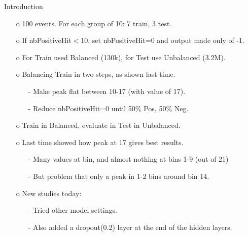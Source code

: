 \documentclass{beamer}
\begin{document}
\begin{frame}{Introduction}
\begin{enumerate}
\item[o] 100 events. For each group of 10: 7 train, 3 test.  
\item[o] If nbPositiveHit$<$10, set nbPositiveHit=0 and output made only of -1.
\item[o] For Train used Balanced (130k), for Test use Unbalanced (3.2M).
\item[o] Balancing Train in two steps, as shown last time.
\begin{enumerate}
\item[-] Make peak flat between 10-17 (with value of 17).
\item[-] Reduce nbPositiveHit=0 until 50\% Pos, 50\% Neg.
\end{enumerate}
\item[o] Train in Balanced, evaluate in Test in Unbalanced.
\item[o] Last time showed how peak at 17 gives best results.
 \begin{enumerate}
\item[-] Many values at bin, and almost nothing at bins 1-9 (out of 21)
\item[-] But problem that only a peak in 1-2 bins around bin 14.
\end{enumerate}
\item[o] New studies today:
 \begin{enumerate}
\item[-] Tried other model settings.
\item[-] Also added a dropout(0.2) layer at the end of the hidden layers.
\end{enumerate}
\end{enumerate}
\end{frame}
\clearpage
\end{document}
